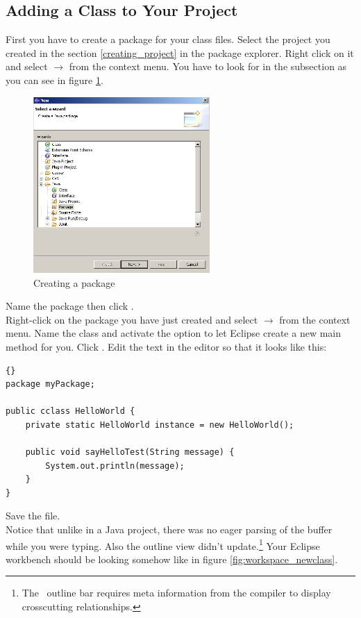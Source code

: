 \subsection{Adding a Class to Your Project}
First you have to create a package for your class files. Select the project you created in the section \ref{creating_project} in the package explorer. Right click on it and select  $\rightarrow$  from the context menu. You have to look for  in the  subsection as you can see in figure \ref{fig:package}.

\begin{figure}[htbp]
	\centering
		\includegraphics[width=0.60\textwidth]{images/package.png}
	\caption{Creating a package}
	\label{fig:package}
\end{figure}

Name the package  then click .\\
Right-click on the package you have just created and select  $\rightarrow$  from the context menu. Name the class  and activate the option to let Eclipse create a new main method for you. Click .
Edit the text in the editor so that it looks like this:
	\begin{lstlisting}[basicstyle=\small\it,caption=HelloWorld.java,label=lst:HelloWorld,name=listing:helloworld,frame=none]{}
package myPackage;

public cclass HelloWorld {
	private static HelloWorld instance = new HelloWorld();
	
	public void sayHelloTest(String message) {
		System.out.println(message);
	}
}
\end{lstlisting}
Save the file.\\
Notice that unlike in a Java project, there was no eager parsing of the buffer while you were typing. Also the outline view didn't update.\footnote{The \caesarj ~outline bar requires meta information from the compiler to display crosscutting relationships.} Your Eclipse workbench should be looking somehow like in figure \ref{fig:workspace_newclass}.\\

